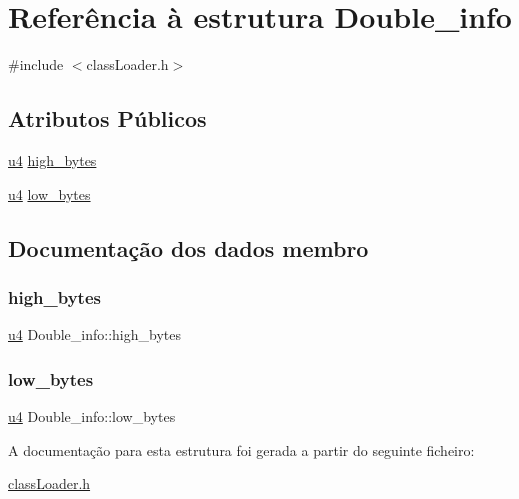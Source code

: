 \hypertarget{struct_double__info}{}\section{Referência à estrutura Double\+\_\+info}
\label{struct_double__info}


{\ttfamily \#include $<$class\+Loader.\+h$>$}

\subsection*{Atributos Públicos}
\begin{DoxyCompactItemize}
\item 
\hyperlink{util_8h_ae391a1d79bb0c8cbc283f0283e3c098b}{u4} \hyperlink{struct_double__info_a9368cd99883647b95074b601e611e7f0}{high\+\_\+bytes}
\item 
\hyperlink{util_8h_ae391a1d79bb0c8cbc283f0283e3c098b}{u4} \hyperlink{struct_double__info_a4bce64af0f7d3ed9f50b6ed9b186e43d}{low\+\_\+bytes}
\end{DoxyCompactItemize}


\subsection{Documentação dos dados membro}
\mbox{\label{struct_double__info_a9368cd99883647b95074b601e611e7f0}} 
\subsubsection{\texorpdfstring{high\+\_\+bytes}{high\_bytes}}
{\footnotesize\ttfamily \hyperlink{util_8h_ae391a1d79bb0c8cbc283f0283e3c098b}{u4} Double\+\_\+info\+::high\+\_\+bytes}

\mbox{\label{struct_double__info_a4bce64af0f7d3ed9f50b6ed9b186e43d}} 
\subsubsection{\texorpdfstring{low\+\_\+bytes}{low\_bytes}}
{\footnotesize\ttfamily \hyperlink{util_8h_ae391a1d79bb0c8cbc283f0283e3c098b}{u4} Double\+\_\+info\+::low\+\_\+bytes}



A documentação para esta estrutura foi gerada a partir do seguinte ficheiro\+:\begin{DoxyCompactItemize}
\item 
\hyperlink{class_loader_8h}{class\+Loader.\+h}\end{DoxyCompactItemize}
